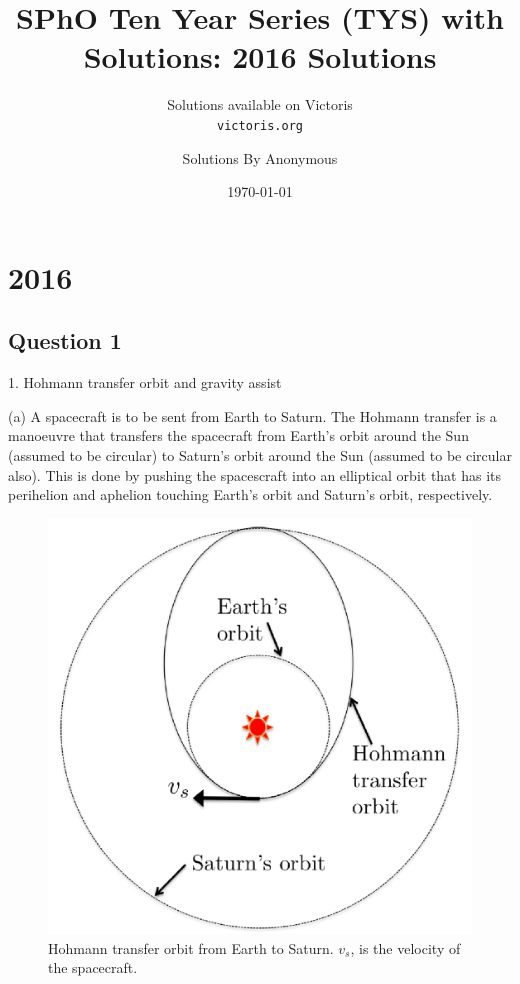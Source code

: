 \documentclass{article}
\title{SPhO Ten Year Series (TYS) with Solutions: 2016 Solutions}
\author{
    Solutions available on Victoris\\
    \texttt{victoris.org}
    \and 
    Solutions By Anonymous
}
\date{\today}
\begin{document}
\maketitle

\section{2016}

\subsection{Question 1}
1. Hohmann transfer orbit and gravity assist

(a) A spacecraft is to be sent from Earth to Saturn. The Hohmann transfer is a manoeuvre that transfers the
spacecraft from Earth’s orbit around the Sun (assumed to be circular) to Saturn’s orbit around the Sun (assumed
to be circular also). This is done by pushing the spacescraft into an elliptical orbit that has its perihelion and
aphelion touching Earth’s orbit and Saturn’s orbit, respectively.

\begin{figure}
	\centering
	\includegraphics[width=0.5\linewidth]{spho_book_TYS_images/2016q1.png}
	\caption{Hohmann transfer orbit from Earth to Saturn. $v_s$, is the velocity of the spacecraft.}
\end{figure}
\end{document}
